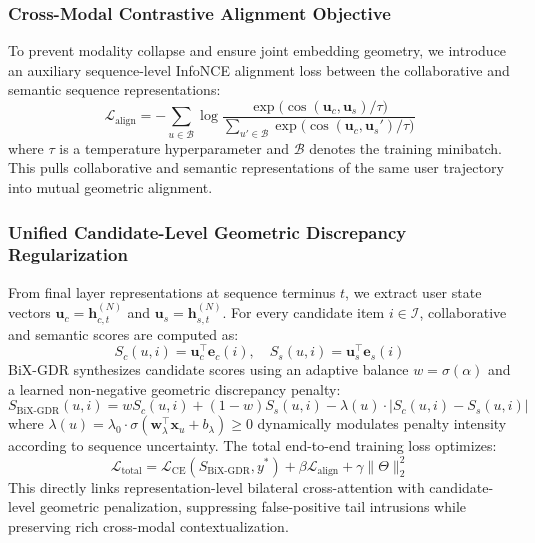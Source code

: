 \subsubsection{Cross-Modal Contrastive Alignment Objective}
To prevent modality collapse and ensure joint embedding geometry, we introduce an auxiliary sequence-level InfoNCE alignment loss between the collaborative and semantic sequence representations:
\begin{equation}
    \mathcal{L}_{\text{align}} = -\sum_{u \in \mathcal{B}} \log \frac{\exp\big(\cos(\mathbf{u}_c, \mathbf{u}_s) / \tau\big)}{\sum_{u' \in \mathcal{B}} \exp\big(\cos(\mathbf{u}_c, \mathbf{u}_{s}') / \tau\big)}
\end{equation}
where $\tau$ is a temperature hyperparameter and $\mathcal{B}$ denotes the training minibatch. This pulls collaborative and semantic representations of the same user trajectory into mutual geometric alignment.

\subsubsection{Unified Candidate-Level Geometric Discrepancy Regularization}
From final layer representations at sequence terminus $t$, we extract user state vectors $\mathbf{u}_c = \mathbf{h}_{c, t}^{(N)}$ and $\mathbf{u}_s = \mathbf{h}_{s, t}^{(N)}$. For every candidate item $i \in \mathcal{I}$, collaborative and semantic scores are computed as:
\begin{equation}
    S_c(u, i) = \mathbf{u}_c^\top \mathbf{e}_c(i), \quad S_s(u, i) = \mathbf{u}_s^\top \mathbf{e}_s(i)
\end{equation}
BiX-GDR synthesizes candidate scores using an adaptive balance $w = \sigma(\alpha)$ and a learned non-negative geometric discrepancy penalty:
\begin{equation}
    S_{\text{BiX-GDR}}(u, i) = w S_c(u, i) + (1-w) S_s(u, i) - \lambda(u) \cdot |S_c(u, i) - S_s(u, i)|
\end{equation}
where $\lambda(u) = \lambda_0 \cdot \sigma(\mathbf{w}_\lambda^\top \mathbf{x}_u + b_\lambda) \ge 0$ dynamically modulates penalty intensity according to sequence uncertainty. The total end-to-end training loss optimizes:
\begin{equation}
    \mathcal{L}_{\text{total}} = \mathcal{L}_{\text{CE}}(S_{\text{BiX-GDR}}, y^*) + \beta \mathcal{L}_{\text{align}} + \gamma \|\Theta\|_2^2
\end{equation}
This directly links representation-level bilateral cross-attention with candidate-level geometric penalization, suppressing false-positive tail intrusions while preserving rich cross-modal contextualization.
